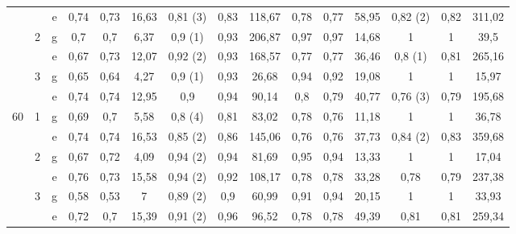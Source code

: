 \begin{table}[h!]
{\begin{tabular}{|c|c|c||ccc|ccc||ccc|ccc|}
          &       & e     & 0,74  & 0,73  & 16,63 & \textcolor[rgb]{ 1,  0,  0}{0,81 (3)} & 0,83  & 118,67 & 0,78  & 0,77  & 58,95 & \textcolor[rgb]{ 1,  0,  0}{0,82 (2)} & 0,82  & 311,02 \bigstrut[b]\\
\cline{2-15}          & \multirow{2}[2]{*}{2} & g     & 0,7   & 0,7   & 6,37  & \textcolor[rgb]{ 1,  0,  0}{0,9 (1)} & 0,93  & 206,87 & 0,97  & 0,97  & 14,68 & 1     & 1     & 39,5 \bigstrut[t]\\
          &       & e     & 0,67  & 0,73  & 12,07 & \textcolor[rgb]{ 1,  0,  0}{0,92 (2)} & 0,93  & 168,57 & 0,77  & 0,77  & 36,46 & \textcolor[rgb]{ 1,  0,  0}{0,8 (1)} & 0,81  & 265,16 \bigstrut[b]\\
\cline{2-15}          & \multirow{2}[2]{*}{3} & g     & 0,65  & 0,64  & 4,27  & \textcolor[rgb]{ 1,  0,  0}{0,9 (1)} & 0,93  & 26,68 & 0,94  & 0,92  & 19,08 & 1     & 1     & 15,97 \bigstrut[t]\\
          &       & e     & 0,74  & 0,74  & 12,95 & 0,9   & 0,94  & 90,14 & 0,8   & 0,79  & 40,77 & \textcolor[rgb]{ 1,  0,  0}{0,76 (3)} & 0,79  & 195,68 \bigstrut[b]\\
    \hline
    \hline
    \multirow{6}[6]{*}{60} & \multirow{2}[2]{*}{1} & g     & 0,69  & 0,7   & 5,58  & \textcolor[rgb]{ 1,  0,  0}{0,8 (4)} & 0,81  & 83,02 & 0,78  & 0,76  & 11,18 & 1     & 1     & 36,78 \bigstrut[t]\\
          &       & e     & 0,74  & 0,74  & 16,53 & \textcolor[rgb]{ 1,  0,  0}{0,85 (2)} & 0,86  & 145,06 & 0,76  & 0,76  & 37,73 & \textcolor[rgb]{ 1,  0,  0}{0,84 (2)} & 0,83  & 359,68 \bigstrut[b]\\
\cline{2-15}          & \multirow{2}[2]{*}{2} & g     & 0,67  & 0,72  & 4,09  & \textcolor[rgb]{ 1,  0,  0}{0,94 (2)} & 0,94  & 81,69 & 0,95  & 0,94  & 13,33 & 1     & 1     & 17,04 \bigstrut[t]\\
          &       & e     & 0,76  & 0,73  & 15,58 & \textcolor[rgb]{ 1,  0,  0}{0,94 (2)} & 0,92  & 108,17 & 0,78  & 0,78  & 33,28 & 0,78  & 0,79  & 237,38 \bigstrut[b]\\
\cline{2-15}          & \multirow{2}[2]{*}{3} & g     & 0,58  & 0,53  & 7     & \textcolor[rgb]{ 1,  0,  0}{0,89 (2)} & 0,9   & 60,99 & 0,91  & 0,94  & 20,15 & 1     & 1     & 33,93 \bigstrut[t]\\
          &       & e     & 0,72  & 0,7   & 15,39 & \textcolor[rgb]{ 1,  0,  0}{0,91 (2)} & 0,96  & 96,52 & 0,78  & 0,78  & 49,39 & 0,81  & 0,81  & 259,34 \bigstrut[b]\\
    \hline
    \end{tabular}}%
  \label{table:tab2}%
\end{table}%

